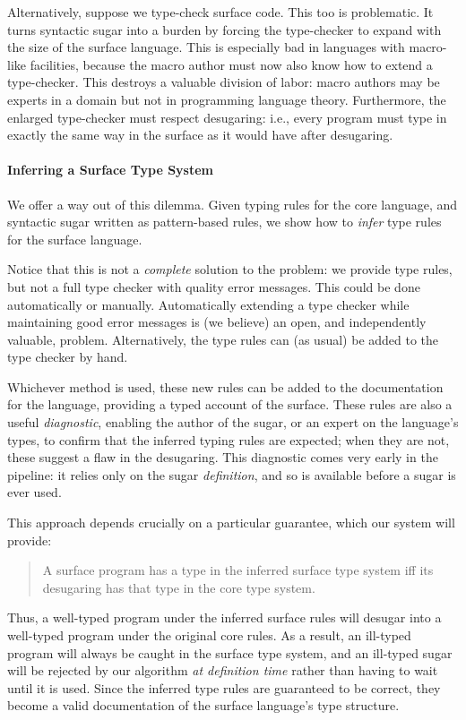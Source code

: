 Alternatively, suppose we type-check surface code. This too is
problematic. It turns syntactic sugar into a burden by
forcing the type-checker to expand with the size of the surface
language. This is especially bad in languages with macro-like
facilities, because the macro author must now also know how to extend
a type-checker. This destroys a valuable division of labor: macro
authors may be experts in a domain but not in programming language
theory.  Furthermore, the enlarged type-checker must respect
desugaring: i.e., every program must type in exactly the same way in
the surface as it would have after desugaring.

\paragraph{Inferring a Surface Type System}

We offer a way out of this dilemma. Given typing rules for the core
language, and syntactic sugar written as pattern-based rules, we show
how to \emph{infer} type rules for the surface language.

Notice that this is not a \emph{complete} solution to the problem: we
provide type rules, but not a full type checker with quality error
messages. This could be done automatically or manually.
Automatically extending a type checker while maintaining good error
messages is (we believe) an open, and independently valuable, problem.
Alternatively, the type rules can (as usual) be added to the type
checker by hand.

Whichever method is used, these new rules can be
added to the documentation for the language, providing a typed account
of the surface. These rules are also a useful \emph{diagnostic},
enabling the author of the sugar, or an expert on the language's
types, to confirm that the inferred typing rules are expected; when
they are not, these suggest a flaw in the desugaring. This diagnostic
comes very early in the pipeline: it relies only on the sugar
\emph{definition}, and so is available before a sugar is ever used.

This approach depends crucially on a particular guarantee, which our
system will provide:
\begin{quotation}
  A surface program has a type in the inferred surface type
  system iff its desugaring has that type in the core type system.
\end{quotation}
Thus, a well-typed program under the inferred surface rules
will desugar into a well-typed program under the original core rules.
As a result, an ill-typed program will always be caught in the surface
type system, and an ill-typed sugar will be rejected by our
algorithm \emph{at definition time} rather than having to wait until
it is used. Since the inferred type rules are guaranteed to be correct,
they become a valid documentation of the
surface language's type structure.

